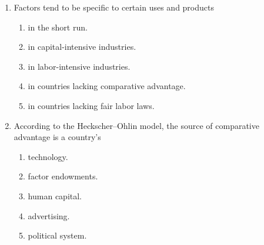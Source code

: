 \documentclass[12pt]{article}
\begin{document}
\begin{enumerate}[label=\textbf{\arabic*.}]
\item Factors tend to be specific to certain uses and products
\begin{enumerate}[label=\Alph*.]
\item in the short run.
\item in capital-intensive industries.
\item in labor-intensive industries.
\item in countries lacking comparative advantage.
\item in countries lacking fair labor laws.
\end{enumerate}

\item According to the Heckscher--Ohlin model, the source of comparative advantage is a country's
\begin{enumerate}[label=\Alph*.]
\item technology.
\item factor endowments.
\item human capital.
\item advertising.
\item political system.
\end{enumerate}


\end{enumerate}
\end{document}
